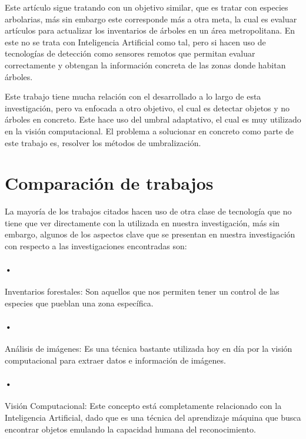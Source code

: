 \cite{rf2} Este artículo sigue tratando con un objetivo similar, que es tratar con especies arbolarias, más sin embargo este corresponde más a otra meta, la cual es evaluar artículos para actualizar los inventarios de árboles en un área metropolitana. En este no se trata con Inteligencia Artificial como tal, pero si hacen uso de tecnologías de detección como sensores remotos que permitan evaluar correctamente y obtengan la información concreta de las zonas donde habitan  árboles.

\cite{rf3} Este trabajo tiene mucha relación con el desarrollado a lo largo de esta investigación, pero va enfocada a otro objetivo, el cual es detectar objetos y no árboles en concreto. Este hace uso del umbral adaptativo, el cual es muy utilizado en la visión computacional. El problema a solucionar en concreto como parte de este trabajo es, resolver los métodos de umbralización. 
 
\section{Comparación de trabajos}
La mayoría de los trabajos citados hacen uso de otra clase de tecnología que no tiene que ver directamente con la utilizada en nuestra investigación, más sin embargo, algunos de los aspectos clave que se presentan en nuestra investigación con respecto a las investigaciones encontradas son:


\paragraph{•} Inventarios forestales: Son aquellos que nos permiten tener un control de las especies que pueblan una zona específica.

\paragraph{•} Análisis de imágenes: Es una técnica bastante utilizada hoy en día por la visión computacional para extraer datos e información de imágenes. 

\paragraph{•} Visión Computacional: Este concepto está completamente relacionado con la Inteligencia Artificial, dado que es una  técnica del aprendizaje máquina que busca encontrar objetos emulando la capacidad humana del reconocimiento.

